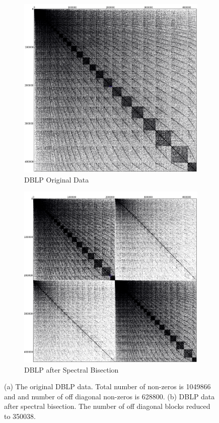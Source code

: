 \documentclass[11pt]{article}
\begin{document}
\begin{figure}
\centering
\begin{subfigure}{.5\textwidth}
	\centering
	\includegraphics[width=.9\linewidth]{figs/DBLP_Original.png}
	\caption{DBLP Original Data}
	\label{fig:DBLP_SB_C0}
\end{subfigure}%
\begin{subfigure}{.5\textwidth}
		\centering
		\includegraphics[width=.9\linewidth]{figs/DBLP_SBC0.png}
		\caption{DBLP after Spectral Bisection}
		\label{fig:DBLP_SB_C4}
	\end{subfigure}
	\caption{ (a) The original DBLP data. Total number of
non-zeros is 1049866 and and number of off diagonal non-zeros is 628800. (b)
DBLP data after spectral bisection. The number of off diagonal blocks
reduced to 350038. } 
	\label{fig:DBLPSB}
\end{figure}
\end{document}
